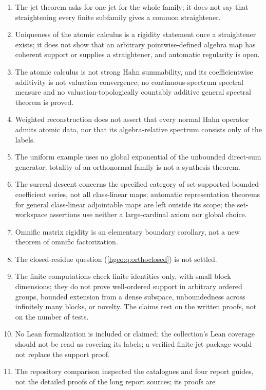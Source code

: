 \documentclass[11pt,letterpaper]{article}
\numberwithin{equation}{section}
\theoremstyle{definition}
\theoremstyle{remark}
\begin{document}
\begin{enumerate}[leftmargin=*,widest=00,label=07.\arabic*]
collection (\cref{hgeo:thm:finite}).
\item The jet theorem asks for one jet for the whole family; it does not say
that straightening every finite subfamily gives a common straightener.
\item Uniqueness of the atomic calculus is a rigidity statement once a
straightener exists; it does not show that an arbitrary pointwise-defined
algebra map has coherent support or supplies a straightener, and automatic
regularity is open.
\item The atomic calculus is not strong Hahn summability, and its
coefficientwise additivity is not valuation convergence; no continuous-spectrum
spectral measure and no valuation-topologically countably additive general
spectral theorem is proved.
\item Weighted reconstruction does not assert that every normal Hahn operator
admits atomic data, nor that its algebra-relative spectrum consists only of
the labels.
\item The uniform example uses no global exponential of the unbounded
direct-sum generator; totality of an orthonormal family is not a synthesis
theorem.
\item The surreal descent concerns the specified category of set-supported
bounded-coefficient series, not all class-linear maps; automatic representation
theorems for general class-linear adjointable maps are left outside its scope;
the set-workspace assertions use neither a large-cardinal axiom nor global
choice.
\item Omnific matrix rigidity is an elementary boundary corollary, not a new
theorem of omnific factorization.
\item The closed-residue question (\cref{hgeo:q:orthoclosed}) is not settled.
\item The finite computations check finite identities only, with small block
dimensions; they do not prove well-ordered support in arbitrary ordered groups,
bounded extension from a dense subspace, unboundedness across infinitely many
blocks, or novelty. The claims rest on the written proofs, not on the number of
tests.
\item No Lean formalization is included or claimed; the collection's Lean
coverage should not be read as covering its labels; a verified finite-jet
package would not replace the support proof.
\item The repository comparison inspected the catalogues and four report
guides, not the detailed proofs of the long report sources; its proofs are

\end{enumerate}
\end{document}
